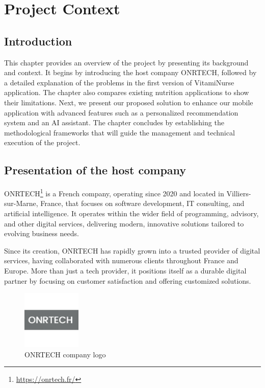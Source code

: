 \chapter{Project Context}
\section*{Introduction}
This chapter provides an overview of the project by presenting its background and context. It begins by introducing the host company ONRTECH, followed by a detailed explanation of the
problems in the first version of VitamiNurse application. The chapter also compares existing nutrition applications to show their limitations. Next, we present our proposed solution to enhance our mobile application with advanced features such as a personalized recommendation system and an AI assistant.
The chapter concludes by establishing the methodological frameworks that will guide the management and technical execution of the project.

\section{Presentation of the host company}
\par ONRTECH\footnote{\url{https://onrtech.fr/}} is a French company, operating since 2020 and located in
Villiers-sur-Marne, France, that focuses on software development, IT consulting, and artificial intelligence.
It operates within the wider field of programming, advisory, and other digital services, delivering modern, innovative solutions tailored to evolving business needs. 
\par Since its creation, ONRTECH has rapidly grown into a trusted provider of digital services, having collaborated with numerous
clients throughout France and Europe. More than just a tech provider, it positions itself as a durable digital partner by focusing on customer satisfaction and offering customized solutions.
\begin{figure}[H]
    \centering
    \includegraphics[width=0.25\textwidth]{images/ONRTECH_logo.jpeg}
    \caption{ONRTECH company logo}
    \label{fig:ONRTECH_logo}
\end{figure}


